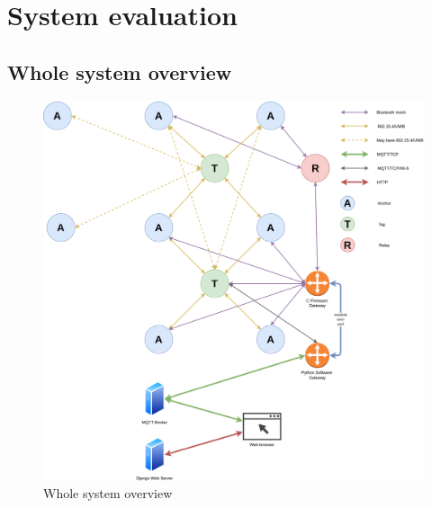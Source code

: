 \documentclass[\main/main.tex]{subfiles}
\begin{document}
\graphicspath{{img/}{06_result/img/}}

\chapter{System evaluation}

\section{Whole system overview}
\begin{figure}[H]
    \centering
    \includegraphics[width=1\textwidth]{system_overview.png}
    \caption{Whole system overview}
    \label{fig:system_overview}
\end{figure}
\end{document}
